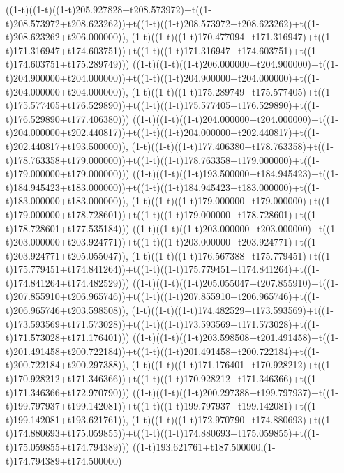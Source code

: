 ((1-t)((1-t)((1-t)205.927828+t208.573972)+t((1-t)208.573972+t208.623262))+t((1-t)((1-t)208.573972+t208.623262)+t((1-t)208.623262+t206.000000)),                                     (1-t)((1-t)((1-t)170.477094+t171.316947)+t((1-t)171.316947+t174.603751))+t((1-t)((1-t)171.316947+t174.603751)+t((1-t)174.603751+t175.289749)))
((1-t)((1-t)((1-t)206.000000+t204.900000)+t((1-t)204.900000+t204.000000))+t((1-t)((1-t)204.900000+t204.000000)+t((1-t)204.000000+t204.000000)),                                     (1-t)((1-t)((1-t)175.289749+t175.577405)+t((1-t)175.577405+t176.529890))+t((1-t)((1-t)175.577405+t176.529890)+t((1-t)176.529890+t177.406380)))
((1-t)((1-t)((1-t)204.000000+t204.000000)+t((1-t)204.000000+t202.440817))+t((1-t)((1-t)204.000000+t202.440817)+t((1-t)202.440817+t193.500000)),                                     (1-t)((1-t)((1-t)177.406380+t178.763358)+t((1-t)178.763358+t179.000000))+t((1-t)((1-t)178.763358+t179.000000)+t((1-t)179.000000+t179.000000)))
((1-t)((1-t)((1-t)193.500000+t184.945423)+t((1-t)184.945423+t183.000000))+t((1-t)((1-t)184.945423+t183.000000)+t((1-t)183.000000+t183.000000)),                                     (1-t)((1-t)((1-t)179.000000+t179.000000)+t((1-t)179.000000+t178.728601))+t((1-t)((1-t)179.000000+t178.728601)+t((1-t)178.728601+t177.535184)))
((1-t)((1-t)((1-t)203.000000+t203.000000)+t((1-t)203.000000+t203.924771))+t((1-t)((1-t)203.000000+t203.924771)+t((1-t)203.924771+t205.055047)),                                     (1-t)((1-t)((1-t)176.567388+t175.779451)+t((1-t)175.779451+t174.841264))+t((1-t)((1-t)175.779451+t174.841264)+t((1-t)174.841264+t174.482529)))
((1-t)((1-t)((1-t)205.055047+t207.855910)+t((1-t)207.855910+t206.965746))+t((1-t)((1-t)207.855910+t206.965746)+t((1-t)206.965746+t203.598508)),                                     (1-t)((1-t)((1-t)174.482529+t173.593569)+t((1-t)173.593569+t171.573028))+t((1-t)((1-t)173.593569+t171.573028)+t((1-t)171.573028+t171.176401)))
((1-t)((1-t)((1-t)203.598508+t201.491458)+t((1-t)201.491458+t200.722184))+t((1-t)((1-t)201.491458+t200.722184)+t((1-t)200.722184+t200.297388)),                                     (1-t)((1-t)((1-t)171.176401+t170.928212)+t((1-t)170.928212+t171.346366))+t((1-t)((1-t)170.928212+t171.346366)+t((1-t)171.346366+t172.970790)))
((1-t)((1-t)((1-t)200.297388+t199.797937)+t((1-t)199.797937+t199.142081))+t((1-t)((1-t)199.797937+t199.142081)+t((1-t)199.142081+t193.621761)),                                     (1-t)((1-t)((1-t)172.970790+t174.880693)+t((1-t)174.880693+t175.059855))+t((1-t)((1-t)174.880693+t175.059855)+t((1-t)175.059855+t174.794389)))
((1-t)193.621761+t187.500000,(1-t)174.794389+t174.500000)
